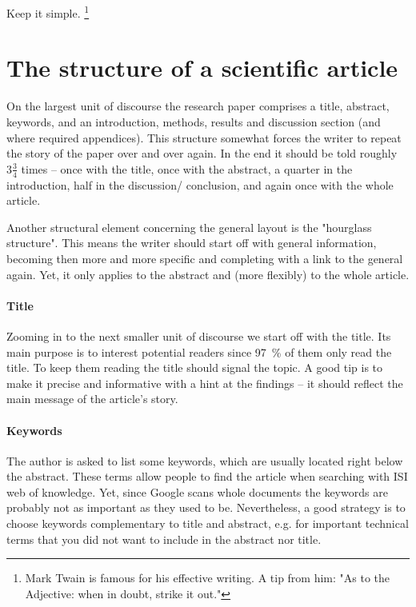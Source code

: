 \documentclass{tufte-book}
\begin{document}
Keep it simple. \footnote{Mark Twain is famous for his effective writing. A tip from him: "As to the Adjective: when in doubt, strike it out."}








\section{The structure of a scientific article}   
On the largest unit of discourse the research paper comprises a title, abstract, keywords, and an introduction, methods, results and discussion section (and where required appendices). 
This structure somewhat forces the writer to repeat the story of the paper over and over again. In the end  it should be told roughly $3\frac{3}{4}$ times -- once with the title, once with the abstract, a quarter in the introduction, half in the discussion/ conclusion, and again once with the whole article.

Another structural element concerning the general layout is the "hourglass structure". This means the writer should start off with general information, becoming then more and more specific and completing with a link to the general again. Yet, it only applies to the abstract and (more flexibly) to the whole article.\\
 
\paragraph{Title}
Zooming in to the next smaller unit of discourse we start off with the title. %
Its main purpose is to interest potential readers since 97~\%  of them only read the title. To keep them reading the title should signal the topic. A good tip is to make it precise and informative with a hint at the findings -- it should reflect the main message of the article's story.\\

\paragraph{Keywords}
The author is asked to list some keywords, %
which are usually located right below the abstract. These terms allow people to find the article when searching with ISI web of knowledge. Yet, since Google scans whole documents the keywords are probably not as important as they used to be. Nevertheless, a good strategy is to choose keywords complementary to title and abstract, e.g. for important technical terms that you
did not want to include in the abstract nor title.\\
\end{document}
